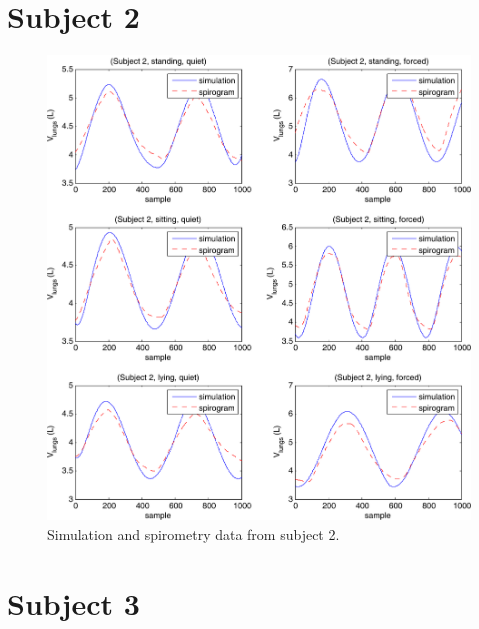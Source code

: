 \newpage
\section{\label{appendixA:p2}Subject 2}

\begin{figure}[H]
	\centering
	 \includegraphics[width=1\textwidth]{pics/j}
	\caption[Simulation and spirometry data from subject 2]{\label{appA:fig:p2}Simulation and spirometry data from subject 2.}
\end{figure}

\newpage
\section{\label{appendixA:p3}Subject 3}

